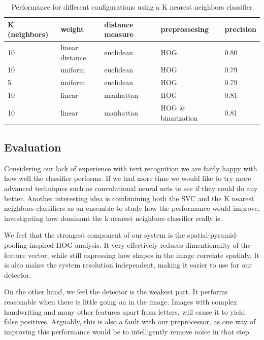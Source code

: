 \documentclass[paper=a4, fontsize=11pt]{scrartcl} %
\numberwithin{equation}{section} %
\numberwithin{figure}{section} %
\numberwithin{table}{section} %
\begin{document}
\begin{table}[H]
    \centering
    \begin{tabular}{l | l | l | l | l}
        K (neighbors) & weight & distance measure & preprossesing & precision\\ \hline
        10 & linear distance & euclidean & HOG & 0.80\\ \hline
        10 & uniform & euclidean & HOG & 0.79\\ \hline
        5 & uniform & euclidean & HOG & 0.79\\ \hline
        10 & linear & manhattan & HOG & 0.81\\ \hline
        10 & linear & manhattan & HOG \& binarization & 0.81\\
    \end{tabular}
    \caption{Performance for different configurations using a K nearest neighbors classifier}
\end{table}



\subsection{Evaluation}
Considering our lack of experience with text recognition we are fairly happy with how well the classifier performs.
If we had more time we would like to try more advanced techniques such as convolutional neural nets to see if they could do any better.
Another interesting idea is combinining both the SVC and the K nearest neighbors classifiers as an ensemble to study how the performance would improve, 
investigating how dominant the k nearest neighbors classifier really is.

We feel that the strongest component of our system is the spatial-pyramid-pooling inspired HOG analysis.
It very effectively reduces dimentionality of the feature vector, while still expressing how shapes in the image correlate spatialy.
It is also makes the system resolution independent, making it easier to use for our detector.

On the other hand, we feel the detector is the weakest part.
It performs reasonable when there is little going on in the image.
Images with complex handwriting and many other features apart from letters, will cause it to yield false positives.
Arguably, this is also a fault with our preprocessor, as one way of improving this performance would be to intelligently remove noice in that step.



 
\end{document}
